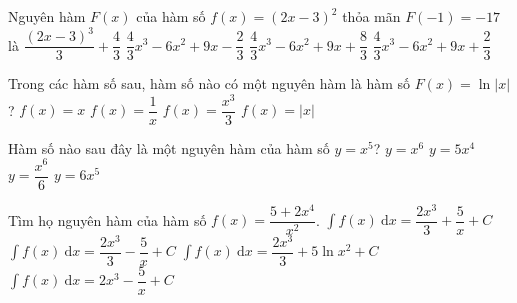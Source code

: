 \begin{ex}%
	 Nguyên hàm $F(x)$ của hàm số $f(x)=(2x-3)^2$ thỏa mãn $F(-1)=-17$ là
	 \choice
		{$\dfrac{(2x-3)^3}{3}+\dfrac{4}{3}$} 
		{\True $\dfrac{4}{3} x^3-6x^2+9x-\dfrac{2}{3}$} 
		{$\dfrac{4}{3} x^3-6x^2+9x+\dfrac{8}{3}$} 
		 {$\dfrac{4}{3} x^3-6x^2+9x+\dfrac{2}{3}$}
\end{ex}

\begin{ex}%
	Trong các hàm số sau, hàm số nào có một nguyên hàm là  hàm số $F(x)=\ln |x|$?
	 \choice
		{$f(x)=x$} 
		 {\True $f(x)=\dfrac{1}{x}$}
		 {$f(x)=\dfrac{x^3}{3}$}
		 {$f(x)=|x|$}
\end{ex}

\begin{ex}%
	Hàm số nào sau đây là một nguyên  hàm của hàm số $ y=x^5$?
	 \choice
		 {$ y=x^6$}
		{$ y=5x^4$} 
		{\True $ y=\dfrac{x^6}{6}$} 
		 {$ y=6x^5$}
\end{ex}

\begin{ex}%
	Tìm họ nguyên hàm của hàm số $f(x)=\dfrac{5+2x^4}{x^2}$. 
	 \choice
		{$\displaystyle\int  f(x)\mathrm{~d} x=\dfrac{2x^3}{3}+\dfrac{5}{x}+C$}
		{\True $\displaystyle\int  f(x)\mathrm{~d} x=\dfrac{2x^3}{3}-\dfrac{5}{x}+C$}
		 {$\displaystyle\int f(x)\mathrm{~d} x=\dfrac{2x^3}{3}+5\ln x^2+C$}
		{$\displaystyle\int f(x)\mathrm{~d}  x=2x^3-\dfrac{5}{x}+C$}
\end{ex}

